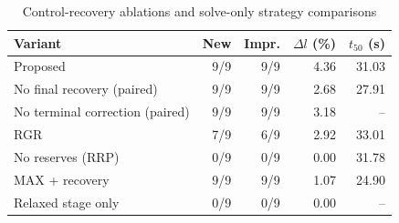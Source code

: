 \begin{table}[!t]
\centering\caption{Control-recovery ablations and solve-only strategy comparisons}
\label{tab:ablation}
\footnotesize\begin{tabular}{lrrrr}
\toprule
Variant & New & Impr. & $\Delta l$ (\%) & $t_{50}$ (s)\\
\midrule
Proposed & 9/9 & 9/9 & 4.36 & 31.03\\
No final recovery (paired) & 9/9 & 9/9 & 2.68 & 27.91\\
No terminal correction (paired) & 9/9 & 9/9 & 3.18 & --\\
RGR & 7/9 & 6/9 & 2.92 & 33.01\\
No reserves (RRP) & 0/9 & 0/9 & 0.00 & 31.78\\
MAX + recovery & 9/9 & 9/9 & 1.07 & 24.90\\
Relaxed stage only & 0/9 & 0/9 & 0.00 & --\\
\bottomrule\end{tabular}
\end{table}
